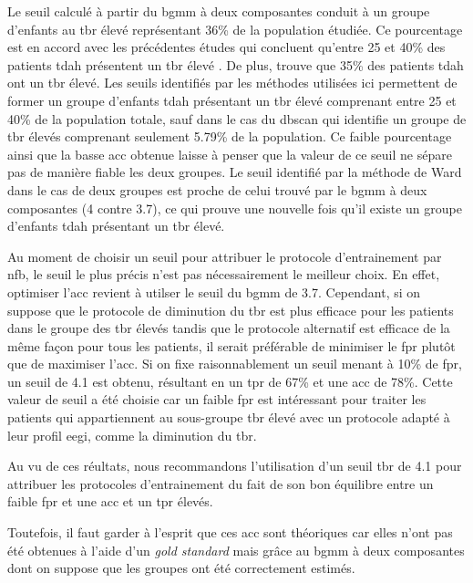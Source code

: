 Le seuil calculé à partir du \gls{bgmm} à deux composantes conduit à un groupe d'enfants au \gls{tbr} élevé représentant 36\% de la population étudiée. 
Ce pourcentage est en accord avec les précédentes études qui concluent qu'entre 25 et 40\% des patients \gls{tdah} présentent un \gls{tbr} élevé \citep{Arns2012}. 
De plus,\citep{Clarke2011} trouve que 35\% des patients \gls{tdah} ont un \gls{tbr} élevé. 
Les seuils identifiés par les méthodes utilisées ici permettent de former un groupe d'enfants \gls{tdah} présentant un \gls{tbr} élevé comprenant entre
25 et 40\% de la population totale, sauf dans le cas du \gls{dbscan} qui identifie un groupe
de \gls{tbr} élevés comprenant seulement 5.79\% de la population. Ce faible pourcentage ainsi que la basse \gls{acc} obtenue laisse à penser
que la valeur de ce seuil ne sépare pas de manière fiable les deux groupes. Le seuil identifié par la méthode de Ward dans le cas de deux groupes
est proche de celui trouvé par le \gls{bgmm} à deux composantes (4 contre 3.7), ce qui prouve une nouvelle fois qu'il existe un groupe d'enfants \gls{tdah}
présentant un \gls{tbr} élevé.

Au moment de choisir un seuil pour attribuer le protocole d'entrainement par \gls{nfb}, le seuil le plus précis n'est pas nécessairement le meilleur choix.
En effet, optimiser l'\gls{acc} revient à utilser le seuil du \gls{bgmm} de 3.7. Cependant, si on suppose que le protocole de diminution du \gls{tbr} est plus 
efficace pour les patients dans le groupe des \gls{tbr} élevés tandis que le protocole alternatif est efficace de la même façon pour tous les patients, il 
serait préférable de minimiser le \gls{fpr} plutôt que de maximiser l'\gls{acc}. Si on fixe raisonnablement un seuil menant à 10\% de \gls{fpr}, un seuil de 4.1
est obtenu, résultant en un \gls{tpr} de 67\% et une \gls{acc} de 78\%. Cette valeur de seuil a été choisie car un faible \gls{fpr} est intéressant pour traiter 
les patients qui appartiennent au sous-groupe \gls{tbr} élevé avec un protocole adapté à leur profil \gls{eegi}, comme la diminution du \gls{tbr}.

Au vu de ces réultats, nous recommandons l'utilisation d'un seuil \gls{tbr} de 4.1 pour attribuer
les protocoles d'entrainement du fait de son bon équilibre entre un faible \gls{fpr} et une \gls{acc} et un \gls{tpr} élevés. 

Toutefois, il faut garder à l'esprit que ces \gls{acc} sont théoriques car elles n'ont pas été obtenues à l'aide d'un \textit{gold standard} mais grâce au \gls{bgmm}
à deux composantes dont on suppose que les groupes ont été correctement estimés. 

